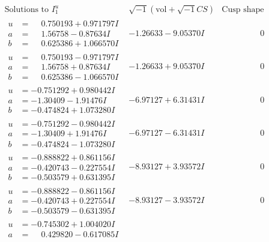 \documentclass[1p]{elsarticle_modified}
\theoremstyle{definition}
\newcommand{\I}{\sqrt{-1}}
\begin{document}
$$\begin{array}{c|c|c}
\text{Solutions to }I^u_{1}& \I (\text{vol} + \sqrt{-1}CS) & \text{Cusp shape}\\
 \hline 
\begin{aligned}
u &= \phantom{-}0.750193 + 0.971797 I \\
a &= \phantom{-}1.56758 - 0.87634 I \\
b &= \phantom{-}0.625386 + 1.066570 I\end{aligned}
 & -1.26633 - 9.05370 I & \phantom{-0.000000 } 0 \\ \hline\begin{aligned}
u &= \phantom{-}0.750193 - 0.971797 I \\
a &= \phantom{-}1.56758 + 0.87634 I \\
b &= \phantom{-}0.625386 - 1.066570 I\end{aligned}
 & -1.26633 + 9.05370 I & \phantom{-0.000000 } 0 \\ \hline\begin{aligned}
u &= -0.751292 + 0.980442 I \\
a &= -1.30409 - 1.91476 I \\
b &= -0.474824 + 1.073280 I\end{aligned}
 & -6.97127 + 6.31431 I & \phantom{-0.000000 } 0 \\ \hline\begin{aligned}
u &= -0.751292 - 0.980442 I \\
a &= -1.30409 + 1.91476 I \\
b &= -0.474824 - 1.073280 I\end{aligned}
 & -6.97127 - 6.31431 I & \phantom{-0.000000 } 0 \\ \hline\begin{aligned}
u &= -0.888822 + 0.861156 I \\
a &= -0.420743 - 0.227554 I \\
b &= -0.503579 + 0.631395 I\end{aligned}
 & -8.93127 + 3.93572 I & \phantom{-0.000000 } 0 \\ \hline\begin{aligned}
u &= -0.888822 - 0.861156 I \\
a &= -0.420743 + 0.227554 I \\
b &= -0.503579 - 0.631395 I\end{aligned}
 & -8.93127 - 3.93572 I & \phantom{-0.000000 } 0 \\ \hline\begin{aligned}
u &= -0.745302 + 1.004020 I \\
a &= \phantom{-}0.429820 - 0.617085 I \\

\end{aligned}
\end{array}$$
\end{document}
